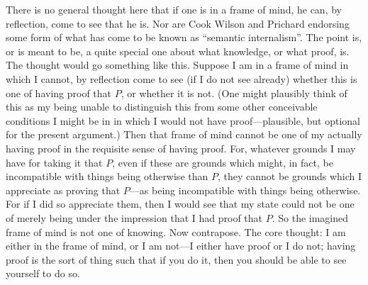 There is no general thought here that if one is in a frame of mind, he can, by reflection, come to see that he is. Nor are Cook Wilson and Prichard endorsing some form of what has come to be known as ``semantic internalism''. The point is, or is meant to be, a quite special one about what knowledge, or what proof, is. The thought would go something like this. Suppose I am in a frame of mind in which I cannot, by reflection come to see (if I do not see already) whether this is one of having proof that \( P \), or whether it is not. (One might plausibly think of this as my being unable to distinguish this from some other conceivable conditions I might be in in which I would not have proof---plausible, but optional for the present argument.) Then that frame of mind cannot be one of my actually having proof in the requisite sense of having proof. For, whatever grounds I may have for taking it that \( P \), even if these are grounds which might, in fact, be incompatible with things being otherwise than \( P \), they cannot be grounds which I appreciate as proving that \( P \)---as being incompatible with things being otherwise. For if I did so appreciate them, then I would see that my state could not be one of merely being under the impression that I had proof that \( P \). So the imagined frame of mind is not one of knowing. Now contrapose. The core thought: I am either in the frame of mind, or I am not---I either have proof or I do not; having proof is the sort of thing such that if you do it, then you should be able to see yourself to do so.

